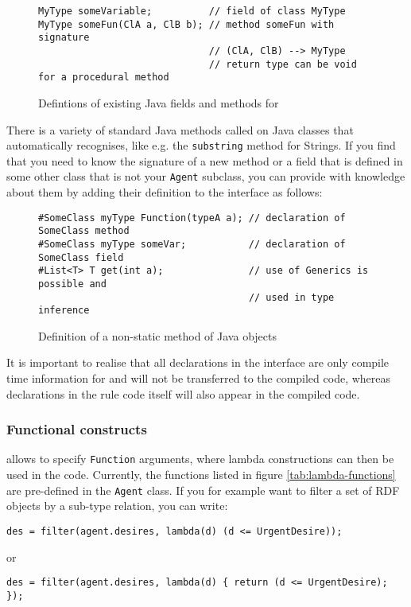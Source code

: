 \begin{figure}[htbp]
\small
\begin{lstlisting}
MyType someVariable;          // field of class MyType
MyType someFun(ClA a, ClB b); // method someFun with signature
                              // (ClA, ClB) --> MyType
                              // return type can be void for a procedural method
\end{lstlisting}\vspace*{-2ex}
\caption{\label{tab:javadef}Defintions of existing Java fields and methods for
  \vonda}
\end{figure}

There is a variety of standard Java methods called on Java classes that \vonda
automatically recognises, like e.g. the \texttt{substring} method for
Strings. If you find that you need \vonda to know the signature of a new method
or a field that is defined in some other class that is not your \texttt{Agent}
subclass, you can provide \vonda with knowledge about them by adding their
definition to the interface as follows:

\begin{figure}[htbp]
\centering
\small
\begin{lstlisting}
#SomeClass myType Function(typeA a); // declaration of SomeClass method
#SomeClass myType someVar;           // declaration of SomeClass field
#List<T> T get(int a);               // use of Generics is possible and
                                     // used in type inference
\end{lstlisting}\vspace*{-2ex}
\caption{\label{tab:methoddef}Definition of a non-static method of Java objects}
\end{figure}

It is important to realise that all declarations in the interface are only
compile time information for \vonda and will not be transferred to the compiled
code, whereas declarations in the rule code itself will also appear in the
compiled code.

\subsubsection{Functional constructs}

\vonda allows to specify \texttt{Function} arguments, where lambda
constructions can then be used in the code. Currently, the functions listed in
figure \ref{tab:lambda-functions} are pre-defined in the \texttt{Agent} class.
If you for example want to filter a set of RDF objects by a sub-type relation,
you can write:
{\small\begin{lstlisting}
des = filter(agent.desires, lambda(d) (d <= UrgentDesire));
\end{lstlisting}}
or
{\small\begin{lstlisting}
des = filter(agent.desires, lambda(d) { return (d <= UrgentDesire); });
\end{lstlisting}}

